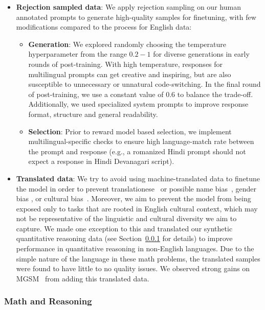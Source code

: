 \documentclass[dvipsnames]{fairmeta}
\begin{document}
\begin{itemize}
        \item \textbf{Rejection sampled data}: We apply rejection sampling on our human annotated prompts to generate high-quality samples for finetuning, with few modifications compared to the process for English data: 
            \begin{itemize} 
                \item \textbf{Generation}: 
                We explored randomly choosing the temperature hyperparameter from the range $0.2-1$ for diverse generations in early rounds of post-training. 
                With high temperature, responses for multilingual prompts can get creative and inspiring, but are also susceptible to unnecessary or unnatural code-switching. In the final round of post-training, we use a constant value of 0.6 to balance the trade-off. Additionally, we used specialized system prompts to improve response format, structure and general readability. 
                \item \textbf{Selection}: Prior to reward model based selection, we implement multilingual-specific checks to ensure high language-match rate between the prompt and response (e.g., a romanized Hindi prompt should not expect a response in Hindi Devanagari script). 
            \end{itemize}
        \item \textbf{Translated data}: We try to avoid using machine-translated data to finetune the model in order to prevent translationese~\citep{bizzoni-etal-2020-human,muennighoff2023crosslingual} or possible name bias~\citep{wang-etal-2022-measuring}, gender bias \citep{10.1162/tacl_a_00401}, or cultural bias~\citep{Ji_Ji_Bouillon_Seligman_2023}. Moreover, we aim to prevent the model from being exposed only to tasks that are rooted in English cultural context, which may not be representative of the linguistic and cultural diversity we aim to capture. We made one exception to this and translated our synthetic quantitative reasoning data (see Section~\ref{subsubsec:reasoning} for details) to improve performance in quantitative reasoning in non-English languages.
        Due to the simple nature of the language in these math problems, the translated samples were found to have little to no quality issues. We observed strong gains on MGSM~\citep{shi2022languagemodelsmultilingualchainofthought} from adding this translated data. 
\end{itemize}

\subsubsection{Math and Reasoning}
\label{subsubsec:reasoning}
\end{document}
